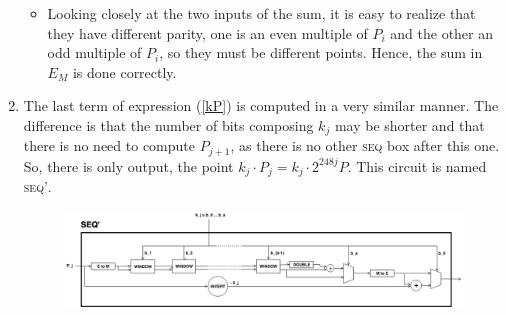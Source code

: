 \begin{enumerate}
\begin{itemize}
		\item Looking closely at the two inputs of the sum, it is easy to realize that they have different parity, one is an even multiple of $P_i$ and the other an odd multiple of $P_i$, so they must be different points. Hence, the sum in $E_M$ is done correctly.
	\end{itemize}
	
	\item The last term of expression (\ref{kP}) is computed in a very similar manner. The difference is that the number of bits composing $k_j$ may be shorter and that there is no need to compute $P_{j+1}$, as there is no other \textsc{seq} box after this one. So, there is only output, the point $k_j \cdot P_j = k_j\cdot 2^{248j} P$. This circuit is named \textsc{seq'}.
	
	\begin{figure}[h]
		\centering
		\includegraphics[scale=0.43]{Diag/Mult_by_scalar_SEQ_prime.png}
	\end{figure}
	
\end{enumerate}
